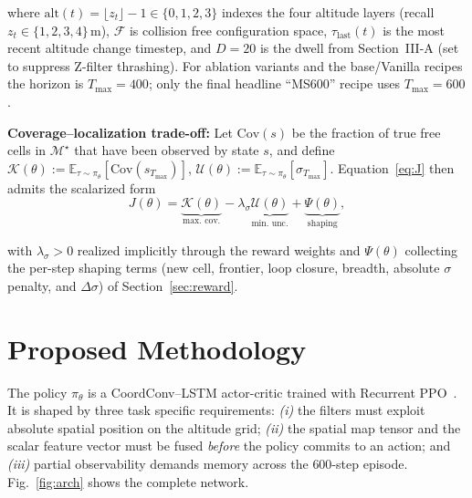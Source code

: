 \documentclass[conference]{IEEEtran}
\begin{document}
\noindent where $\mathrm{alt}(t)\!=\!\lfloor z_t\rfloor\!-\!1\!\in\!\{0,1,2,3\}$ indexes the four altitude layers (recall $z_t\!\in\!\{1,2,3,4\}\,\text{m}$), $\mathcal{F}$ is collision free configuration space, $\tau_{\text{last}}(t)$ is the most recent altitude change timestep, and $D\!=\!20$ is the dwell from Section~III-A (set to suppress Z-filter thrashing). For ablation variants and the base/Vanilla recipes the horizon is $T_{\max}\!=\!400$; only the final headline ``MS600'' recipe uses $T_{\max}\!=\!600$.

\noindent\textbf{Coverage--localization trade-off:} Let $\mathrm{Cov}(s)$ be the fraction of true free cells in $\mathcal{M}^{\star}$ that have been observed by state $s$, and define $\mathcal{K}(\theta)\!:=\!\mathbb{E}_{\tau\sim\pi_\theta}[\mathrm{Cov}(s_{T_{\max}})]$, $\mathcal{U}(\theta)\!:=\!\mathbb{E}_{\tau\sim\pi_\theta}[\sigma_{T_{\max}}]$. Equation~\eqref{eq:J} then admits the scalarized form
\vspace{-2pt}
\begin{equation}
J(\theta) = \underbrace{\mathcal{K}(\theta)}_{\text{max.\ cov.}} - \lambda_\sigma\underbrace{\mathcal{U}(\theta)}_{\text{min.\ unc.}} + \underbrace{\Psi(\theta)}_{\text{shaping}},
\label{eq:multiobj}
\end{equation}
\vspace{-3pt}

\noindent with $\lambda_\sigma\!>\!0$ realized implicitly through the reward weights and $\Psi(\theta)$ collecting the per-step shaping terms (new cell, frontier, loop closure, breadth, absolute $\sigma$ penalty, and $\Delta\sigma$) of Section~\ref{sec:reward}.

\section{Proposed Methodology}\label{sec:arch}

The policy $\pi_\theta$ is a CoordConv--LSTM actor-critic trained with Recurrent PPO~\cite{raffin2021sb3,ni2022recurrent}. It is shaped by three task specific requirements: \emph{(i)} the filters must exploit absolute spatial position on the altitude grid; \emph{(ii)} the spatial map tensor and the scalar feature vector must be fused \emph{before} the policy commits to an action; and \emph{(iii)} partial observability demands memory across the $600$-step episode. Fig.~\ref{fig:arch} shows the complete network.
\end{document}
